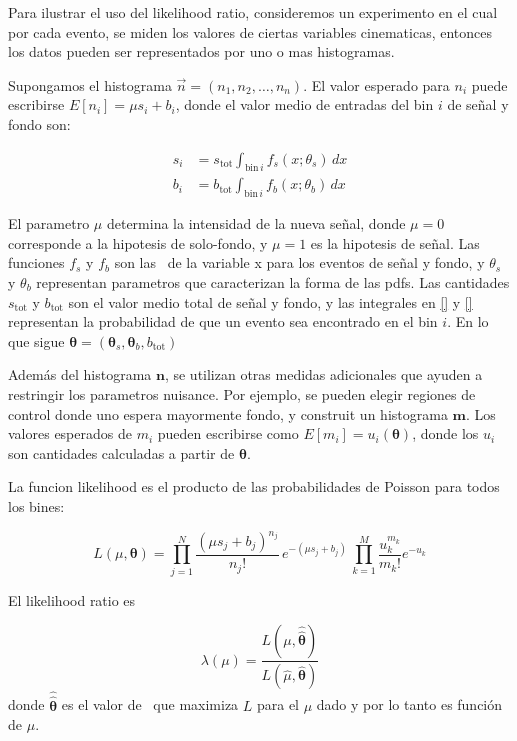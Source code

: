 Para ilustrar el uso del likelihood ratio, consideremos un experimento en el cual por cada evento,
se miden los valores de ciertas variables cinematicas, entonces los datos pueden ser representados
por uno o mas histogramas.

Supongamos el histograma $\vec{n} = (n_1, n_2, \ldots, n_n)$. El valor esperado para $n_i$ puede
escribirse $E[n_i] = \mu s_i + b_i$, donde el valor medio de entradas del bin $i$ de se\~nal y fondo
son:

\begin{align}
  s_i &= s_\text{tot} \int_{\text{bin}\, i} f_s (x; \theta_s)\, dx \\
  b_i &= b_\text{tot} \int_{\text{bin}\, i} f_b (x; \theta_b)\, dx
\end{align}

El parametro $\mu$ determina la intensidad de la nueva se\~nal, donde $\mu=0$ corresponde a la
hipotesis de solo-fondo, y $\mu=1$ es la hipotesis de se\~nal.
Las funciones $f_s$ y $f_b$ son las \pdf\ de la variable x para los eventos de se\~nal y fondo, y
$\theta_s$ y $\theta_b$ representan parametros que caracterizan la forma de las pdfs. Las
cantidades $s_\text{tot}$ y $b_\text{tot}$ son el valor medio total de se\~nal y fondo, y las
integrales en \ref{} y \ref{} representan la probabilidad de que un evento sea encontrado en el
bin $i$. En lo que sigue $\bm{\theta} = (\bm{\theta}_s, \bm{\theta}_b, b_\text{tot})$

Además del histograma $\bm{n}$, se utilizan otras medidas adicionales que ayuden a restringir
los parametros nuisance. Por ejemplo, se pueden elegir regiones de control donde uno espera
mayormente fondo, y construit un histograma $\bm{m}$. Los valores esperados de $m_i$ pueden
escribirse como $E[m_i] = u_i(\bm{\theta})$, donde los $u_i$ son cantidades calculadas a partir
de $\bm{\theta}$.

La funcion likelihood es el producto de las probabilidades de Poisson para todos los bines:

\begin{equation}
  L(\mu, \bm{\theta}) = \prod_{j=1}^N \frac{(\mu s_j + b_j)^{n_j}}{n_j!} \,  e^{-(\mu s_j + b_j)} \, \prod_{k=1}^M \frac{u_k^{m_k}}{m_k!} e^{-u_k}
\end{equation}


El likelihood ratio es

\begin{equation}
  \lambda(\mu) = \frac{L(\mu, \hat{\hat{\bm{\theta}}})}{L(\hat{\mu}, \hat{\bm{\theta}})}
\end{equation}
%
donde $\bm{\hat{\hat{\theta}}}$ es el valor de \btheta\ que maximiza $L$ para el $\mu$ dado y por
lo tanto es función de $\mu$.

